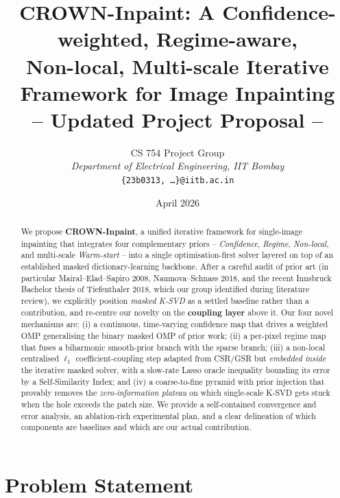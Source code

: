 \documentclass[11pt,a4paper]{article}
\title{\textbf{CROWN-Inpaint}: A Confidence-weighted, Regime-aware, \\
       Non-local, Multi-scale Iterative Framework for Image Inpainting \\
       \vspace{0.3em}
       \large -- Updated Project Proposal --}
\author{%
  CS 754 Project Group \\
  \textit{Department of Electrical Engineering, IIT Bombay} \\
  \texttt{\{23b0313, …\}@iitb.ac.in}}
\date{April 2026}
\theoremstyle{definition}
\theoremstyle{remark}
\begin{document}
\maketitle

\begin{abstract}
\noindent
We propose \textbf{CROWN-Inpaint}, a unified iterative framework for
single-image inpainting that integrates four complementary priors --
\emph{Confidence}, \emph{Regime}, \emph{Non-local}, and multi-scale
\emph{Warm-start} -- into a single optimisation-first solver layered on
top of an established masked dictionary-learning backbone. After a
careful audit of prior art (in particular Mairal--Elad--Sapiro 2008,
Naumova--Schnass 2018, and the recent Innsbruck Bachelor thesis of
Tiefenthaler 2018, which our group identified during literature
review), we explicitly position \emph{masked K-SVD} as a settled
baseline rather than a contribution, and re-centre our novelty on the
\textbf{coupling layer} above it. Our four novel mechanisms are: (i) a
continuous, time-varying confidence map that drives a weighted OMP
generalising the binary masked OMP of prior work; (ii) a per-pixel
regime map that fuses a biharmonic smooth-prior branch with the sparse
branch; (iii) a non-local centralised $\ell_1$ coefficient-coupling
step adapted from CSR/GSR but \emph{embedded inside} the iterative
masked solver, with a slow-rate Lasso oracle inequality bounding its
error by a Self-Similarity Index; and (iv) a coarse-to-fine pyramid
with prior injection that provably removes the
\emph{zero-information plateau} on which single-scale K-SVD gets stuck
when the hole exceeds the patch size. We provide a self-contained
convergence and error analysis, an ablation-rich experimental plan,
and a clear delineation of which components are baselines and which
are our actual contribution.
\end{abstract}

\section{Problem Statement}
\end{document}
